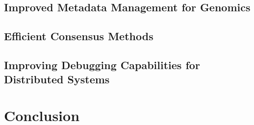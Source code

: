 \documentclass[phd]{ucbthesis}
\begin{document}
\section{Improved Metadata Management for Genomics}
\label{sec:metadata-future}

\section{Efficient Consensus Methods}
\label{sec:efficient-consensus}

\section{Improving Debugging Capabilities for Distributed Systems}
\label{sec:improving-debug}

\chapter{Conclusion}
\label{chap:conclusion}

\backmatter



\end{document}
